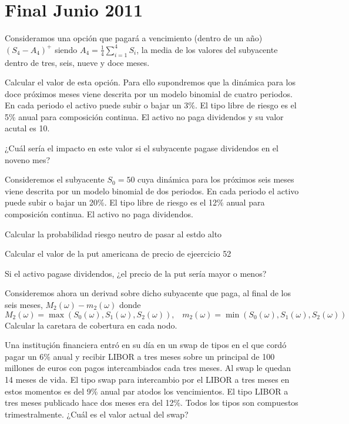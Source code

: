 \section{Final Junio 2011}
\begin{problem}[1]
Consideramos una opción que pagará a vencimiento (dentro de un año) $(S_4-A_4)^+$ siendo $A_4=\frac{1}{4}\sum_{i=1}^4S_i$, la media de los valores del subyacente dentro de tres, seis, nueve y doce meses.

\ppart Calcular el valor de esta opción. Para ello supondremos que la dinámica para los doce próximos meses viene descrita por un modelo binomial de cuatro periodos. En cada periodo el activo puede subir o bajar un 3\%. El tipo libre de riesgo es el 5\% anual para composición continua. El activo no paga dividendos y su valor acutal es 10.

\ppart ¿Cuál sería el impacto en este valor si el subyacente pagase dividendos en el noveno mes?

\solution

\end{problem}

\begin{problem}[2]
Consideremos el subyacente $S_0=50$ cuya dinámica para los próximos seis meses viene descrita por un modelo binomial de dos periodos. En cada periodo el activo puede subir o bajar un 20\%. El tipo libre de riesgo es el 12\% anual para composición continua. El activo no paga dividendos.

\ppart Calcular la probabilidad riesgo neutro de pasar al estdo alto

\ppart Calcular el valor de la put americana de precio de ejeercicio 52

\ppart Si el activo pagase dividendos, ¿el precio de la put sería mayor o menos?

\ppart Consideremos ahora un derivad sobre dicho subyacente que paga, al final de los seis meses, $M_2(ω)-m_2(ω)$ donde
\[M_2(ω)=\max(S_0(ω),S_1(ω),S_2(ω)), \;\;\; m_2(ω)=\min(S_0(ω),S_1(ω),S_2(ω))\]
Calcular la caretara de cobertura en cada nodo.

\solution

\end{problem}

\begin{problem}[3]
Una instituçión financiera entró en su día en un swap de tipos en el que cordó pagar un 6\% anual y recibir LIBOR a tres meses sobre un principal de 100 millones de euros con pagos intercambiados cada tres meses. Al swap le quedan 14 meses de vida. El tipo swap para intercambio por el LIBOR a tres meses en estos momentos es del 9\% anual par atodos los vencimientos. El tipo LIBOR a tres meses publicado hace dos meses era del 12\%. Todos los tipos son compuestos trimestralmente. ¿Cuál es el valor actual del swap?
\solution

\end{problem}

